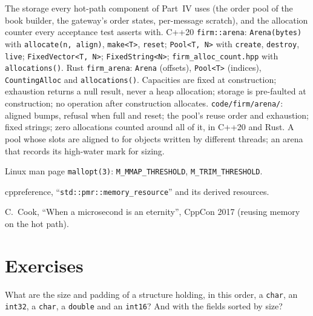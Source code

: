 \begin{build}
 The storage every hot-path component of Part~IV uses (the order pool of the book builder, the gateway's
order states, per-message scratch), and the allocation counter every acceptance test asserts with.
 C++20 \texttt{firm::arena}: \texttt{Arena(bytes)} with \texttt{allocate(n, align)}, \texttt{make<T>},
\texttt{reset}; \texttt{Pool<T, N>} with \texttt{create}, \texttt{destroy}, \texttt{live}; \texttt{FixedVector<T, N>};
\texttt{FixedString<N>}; \texttt{firm\_alloc\_count.hpp} with \texttt{allocations()}. Rust \texttt{firm\_arena}:
\texttt{Arena} (offsets), \texttt{Pool<T>} (indices), \texttt{CountingAlloc} and \texttt{allocations()}.
 Capacities are fixed at construction; exhaustion returns a null result, never a heap allocation; storage is
pre-faulted at construction; no operation after construction allocates.
 \texttt{code/firm/arena/}: aligned bumps, refusal when full and reset; the pool's reuse order and
exhaustion; fixed strings; zero allocations counted around all of it, in C++20 and Rust.
 A pool whose slots are aligned to  for objects written by different threads; an arena that
records its high-water mark for sizing.
\end{build}

\begin{omsources}
\item Linux man page \texttt{mallopt(3)}: \texttt{M\_MMAP\_THRESHOLD}, \texttt{M\_TRIM\_THRESHOLD}.
\item cppreference, ``\texttt{std::pmr::memory\_resource}'' and its derived resources.
\item C.~Cook, ``When a microsecond is an eternity'', CppCon 2017 (reusing memory on the hot path).
\end{omsources}

\section{Exercises}

\begin{exercise}[$\star$]\label{exo:ll:cpp-for-latency-i-memory:1}
What are the size and padding of a structure holding, in this order, a \texttt{char}, an \texttt{int32}, a \texttt{char},
a \texttt{double} and an \texttt{int16}? And with the fields sorted by size?
\end{exercise}

